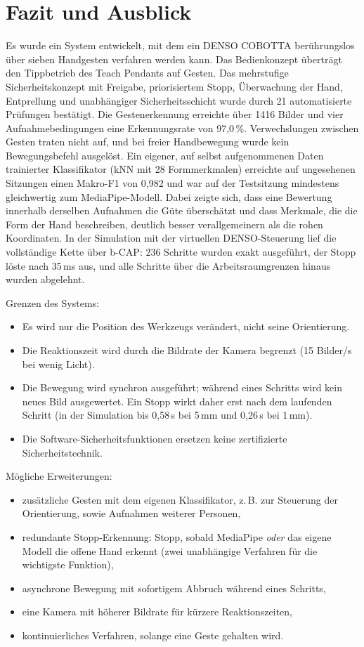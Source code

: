 \documentclass[11pt,a4paper]{article}
\begin{document}
\section{Fazit und Ausblick}

Es wurde ein System entwickelt, mit dem ein DENSO COBOTTA berührungslos über sieben Handgesten
verfahren werden kann. Das Bedienkonzept überträgt den Tippbetrieb des Teach Pendants auf Gesten.
Das mehrstufige Sicherheitskonzept mit Freigabe, priorisiertem Stopp, Überwachung der Hand,
Entprellung und unabhängiger Sicherheitsschicht wurde durch 21 automatisierte Prüfungen bestätigt.
Die Gestenerkennung erreichte über 1416 Bilder und vier Aufnahmebedingungen eine Erkennungsrate
von 97,0\,\%. Verwechslungen zwischen Gesten traten nicht auf, und bei freier Handbewegung wurde
kein Bewegungsbefehl ausgelöst. Ein eigener, auf selbst aufgenommenen Daten trainierter
Klassifikator (kNN mit 28 Formmerkmalen) erreichte auf ungesehenen Sitzungen einen Makro-F1 von
0,982 und war auf der Testsitzung mindestens gleichwertig zum MediaPipe-Modell. Dabei zeigte sich,
dass eine Bewertung innerhalb derselben Aufnahmen die Güte überschätzt und dass Merkmale, die die
Form der Hand beschreiben, deutlich besser verallgemeinern als die rohen Koordinaten.
In der Simulation mit der virtuellen DENSO-Steuerung lief die vollständige Kette über b-CAP:
236 Schritte wurden exakt ausgeführt, der Stopp löste nach 35\,ms aus, und alle Schritte über die
Arbeitsraumgrenzen hinaus wurden abgelehnt.

Grenzen des Systems:
\begin{itemize}
  \item Es wird nur die Position des Werkzeugs verändert, nicht seine Orientierung.
  \item Die Reaktionszeit wird durch die Bildrate der Kamera begrenzt (15 Bilder/s bei wenig Licht).
  \item Die Bewegung wird synchron ausgeführt; während eines Schritts wird kein neues Bild
        ausgewertet. Ein Stopp wirkt daher erst nach dem laufenden Schritt (in der Simulation bis
        0,58\,s bei 5\,mm und 0,26\,s bei 1\,mm).
  \item Die Software-Sicherheitsfunktionen ersetzen keine zertifizierte Sicherheitstechnik.
\end{itemize}

Mögliche Erweiterungen:
\begin{itemize}
  \item zusätzliche Gesten mit dem eigenen Klassifikator, z.\,B. zur Steuerung der Orientierung,
        sowie Aufnahmen weiterer Personen,
  \item redundante Stopp-Erkennung: Stopp, sobald MediaPipe \emph{oder} das eigene Modell die
        offene Hand erkennt (zwei unabhängige Verfahren für die wichtigste Funktion),
  \item asynchrone Bewegung mit sofortigem Abbruch während eines Schritts,
  \item eine Kamera mit höherer Bildrate für kürzere Reaktionszeiten,
  \item kontinuierliches Verfahren, solange eine Geste gehalten wird.
\end{itemize}
\end{document}

